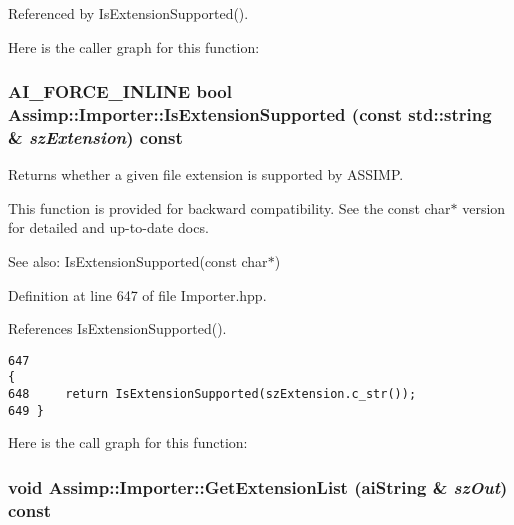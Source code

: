 Referenced by IsExtensionSupported().

Here is the caller graph for this function:\hypertarget{class_assimp_1_1_importer_5b01905366f5bf8d1f89d51f755bf7d2}{
\subsubsection[IsExtensionSupported]{\setlength{\rightskip}{0pt plus 5cm}AI\_\-FORCE\_\-INLINE bool Assimp::Importer::IsExtensionSupported (const std::string \& {\em szExtension}) const}}
\label{class_assimp_1_1_importer_5b01905366f5bf8d1f89d51f755bf7d2}


Returns whether a given file extension is supported by ASSIMP. 

This function is provided for backward compatibility. See the const char$\ast$ version for detailed and up-to-date docs. \begin{Desc}
\item[See also:]IsExtensionSupported(const char$\ast$) \end{Desc}


Definition at line 647 of file Importer.hpp.

References IsExtensionSupported().

\begin{Code}\begin{verbatim}647                                                                                         {
648     return IsExtensionSupported(szExtension.c_str());
649 }
\end{verbatim}
\end{Code}




Here is the call graph for this function:\hypertarget{class_assimp_1_1_importer_23c85647f7977012d9fef20b36c2d579}{
\subsubsection[GetExtensionList]{\setlength{\rightskip}{0pt plus 5cm}void Assimp::Importer::GetExtensionList ({\bf aiString} \& {\em szOut}) const}}
\label{class_assimp_1_1_importer_23c85647f7977012d9fef20b36c2d579}


